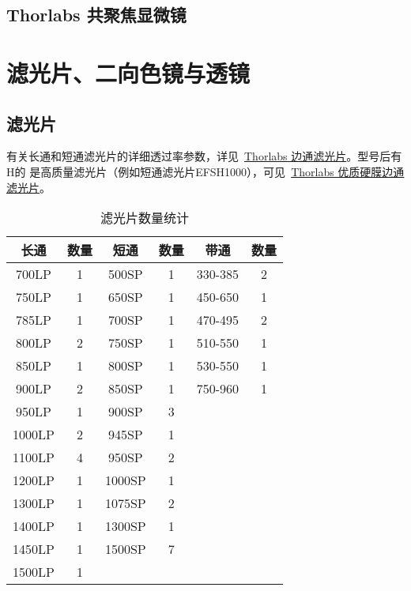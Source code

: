 \documentclass[cn,11pt,chinese]{elegantbook}
\begin{document}
\subsection{Thorlabs 共聚焦显微镜}

\section{滤光片、二向色镜与透镜}
\subsection{滤光片}
有关长通和短通滤光片的详细透过率参数，详见~\href{https://www.thorlabschina.cn/newgrouppage9.cfm?objectgroup_id=918}{Thorlabs 边通滤光片}。型号后有H的
是高质量滤光片（例如短通滤光片EFSH1000），可见~\href{https://www.thorlabschina.cn/newgrouppage9.cfm?objectgroup_id=6082}{Thorlabs 优质硬膜边通滤光片}。


\begin{table}[ht]
  \centering
  \caption{滤光片数量统计}
  \begin{tabular}{cc|cc|cc}
    \toprule
    长通&数量&短通&数量&带通&数量 \\
    \midrule
    700LP & 1     & 500SP & 1     & 330-385 & 2 \\
    750LP & 1     & 650SP & 1     & 450-650 & 1 \\
    785LP & 1     & 700SP & 1     & 470-495 & 2 \\
    800LP & 2     & 750SP & 1     & 510-550 & 1 \\
    850LP & 1     & 800SP & 1     & 530-550 & 1 \\
    900LP & 2     & 850SP & 1     & 750-960 & 1 \\
    950LP & 1     & 900SP & 3     &       &  \\
    1000LP & 2     & 945SP & 1     &       &  \\
    1100LP & 4     & 950SP & 2     &       &  \\
    1200LP & 1     & 1000SP & 1     &       &  \\
    1300LP & 1     & 1075SP & 2     &       &  \\
    1400LP & 1     & 1300SP & 1     &       &  \\
    1450LP & 1     & 1500SP & 7     &       &  \\
    1500LP & 1     &       &       &       &  \\


    \bottomrule
  \end{tabular}
  \label{tab:filter}
\end{table}
\end{document}
